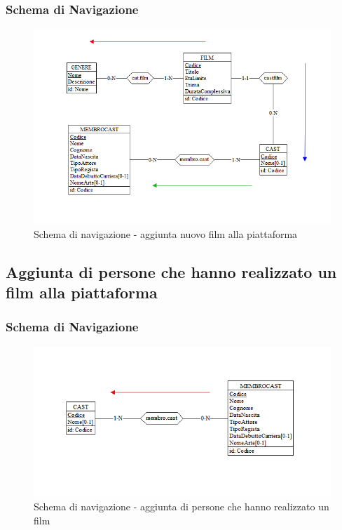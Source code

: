 \documentclass[a4paper,12pt]{report}
\begin{document}
	\subsubsection{Schema di Navigazione}
	\begin{figure}[H]
		\centering
		\includegraphics[width=450pt]{ER/navigazione/aggiuntafilm.png}
		\caption{Schema di navigazione - aggiunta nuovo film alla piattaforma}
	\end{figure}
	\subsection{Aggiunta di persone che hanno realizzato un film alla piattaforma}
	\subsubsection{Schema di Navigazione}
	\begin{figure}[H]
		\centering
		\includegraphics[width=450pt]{ER/navigazione/aggiuntacast.png}
		\caption{Schema di navigazione - aggiunta di persone che hanno realizzato un film}
	\end{figure}
\end{document}
